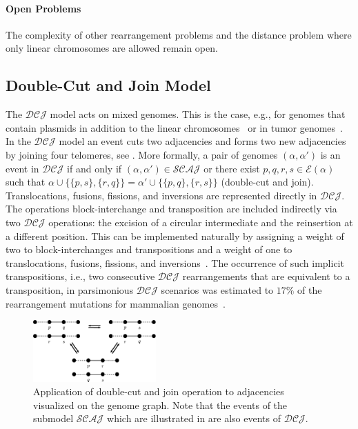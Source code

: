 \documentclass{svmult}
\newcommand{\m}[1]{\mathcal{#1}}
\begin{document}
\paragraph{Open Problems}

The complexity of other rearrangement problems and the distance problem where only linear chromosomes are allowed remain open.

\subsection{Double-Cut and Join Model}
\label{sec:dcj}

The $\m{DCJ}$ model acts on mixed genomes.
This is the case, e.g., for genomes that contain plasmids in addition to the linear
chromosomes~\cite{Casjens_2000,Qiu_2004,Volff_2000} or in tumor genomes~\cite{Raphael_2004}.
In the $\m{DCJ}$ model an event cuts two adjacencies and forms two new 
adjacencies by joining four telomeres, see . 
More formally, a pair of genomes $(\alpha,\alpha')$ is
an event in $\m{DCJ}$ if and only if $(\alpha,\alpha')\in \m{SCAJ}$ or there
exist $p, q, r, s\in \mathcal{E}(\alpha)$ such that
$\alpha\cup\{\{p,s\},\{r,q\}\}=\alpha'\cup\{\{p,q\},\{r,s\}\}$ (double-cut and
join).
%
Translocations, fusions, fissions, and inversions are represented directly in $\m{DCJ}$. 
The operations block-interchange and transposition are included indirectly via two $\m{DCJ}$ operations: 
the excision of a circular intermediate and the reinsertion at a different position. 
This can be implemented naturally by assigning a weight of two to
block-interchanges and transpositions and a weight of one to translocations,
fusions, fissions, and inversions~\cite{Yancopoulos_2005}.
The occurrence of such implicit transpositions, i.e., two consecutive $\m{DCJ}$ rearrangements that are equivalent to a transposition, 
in parsimonious $\m{DCJ}$ scenarios was estimated to $17\%$ of the rearrangement mutations for mammalian genomes~\cite{Jiang_2015}. 

\begin{figure}
	\begin{center}
		\includegraphics[width=0.42\textwidth]{figures/dcj_genome_graph.pdf}
	\end{center}
	\caption{Application of double-cut and join operation to adjacencies visualized on the genome graph.
		Note that the events of the submodel $\mathcal{SCAJ}$
		which are illustrated in  are also events of
		$\mathcal{DCJ}$. }
	\label{fig:DCJ_events}
\end{figure}
\end{document}
